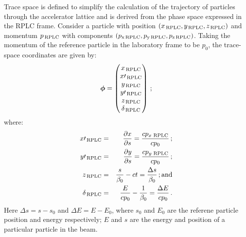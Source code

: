 Trace space is defined to simplify the calculation of the trajectory
of particles through the accelerator lattice and is derived from the
phase space expressed in the RPLC frame.
Consider a particle with position
$(x_{\rm\,RPLC}, y_{\rm\,RPLC}, z_{\rm\,RPLC})$ and momentum 
$p_{\rm\,RPLC}$ with components
$(p_{\rm x\,RPLC}, p_{\rm y\,RPLC}, p_{\rm z\,RPLC})$.
Taking the momentum of the reference particle in the laboratory frame
to be $p_0$, the trace-space coordinates are given by:
\begin{equation}
    \bm{\phi} = \begin{pmatrix}
                  x_{\rm\,RPLC}       \\
                  x\prime_{\rm\,RPLC} \\
                  y_{\rm\,RPLC}       \\
                  y\prime_{\rm\,RPLC} \\
                  z_{\rm\,RPLC}       \\
                  \delta_{\rm\,RPLC}
                \end{pmatrix} \, ;
\end{equation}
where:
\begin{eqnarray}
  x\prime_{\rm\,RPLC}  & = & \frac{\partial x}{\partial s} = \frac{cp_{x\,{\rm\,RPLC}}}{cp_0} \, ; \\
  y\prime_{\rm\,RPLC}  & = & \frac{\partial y}{\partial s} = \frac{cp_{y\,{\rm\,RPLC}}}{cp_0} \, ; \\
  z_{\rm\,RPLC}        & = & \frac{s}{\beta_0} - ct = \frac{\Delta s}{\beta_0}                    \, {\rm ; and} \\
  \delta_{\rm\,RPLC}   & = & \frac{E}{c p_0} - \frac{1}{\beta_0} = \frac{\Delta E}{cp_0}          \, .    
\end{eqnarray}
Here $\Delta s = s - s_0$ and $\Delta E = E - E_0$, where $s_0$ and
$E_0$ are the referene particle position and energy respectively; $E$
and $s$ are the energy and position of a particular particle in the
beam.
